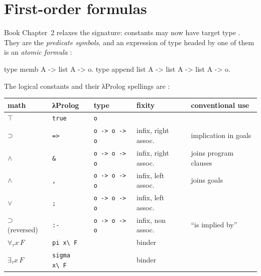 \section{First-order formulas}\label{sec:horn-formulas}

Book Chapter~2 relaxes the signature: constants may now have target type . They are the
\emph{predicate symbols}, and an expression of type  headed by one of them is an \emph{atomic
formula} :
\begin{lprolog}
type memb    A -> list A -> o.
type append  list A -> list A -> list A -> o.
\end{lprolog}
The logical constants and their λProlog spellings are :
\par\medskip
\begin{fullwidth}
\begin{center}
\begin{tabular}{@{}lllll@{}}
\toprule
math & λProlog & type & fixity & conventional use\\
\midrule
$\top$ & \texttt{true} & \texttt{o} & & \\
$\supset$ & \texttt{=>} & \texttt{o -> o -> o} & infix, right assoc. & implication in goals\\
$\wedge$ & \texttt{\&} & \texttt{o -> o -> o} & infix, right assoc. & joins program clauses\\
$\wedge$ & \texttt{,} & \texttt{o -> o -> o} & infix, left assoc. & joins goals\\
$\vee$ & \texttt{;} & \texttt{o -> o -> o} & infix, left assoc. & \\
$\supset$ (reversed) & \texttt{:-} & \texttt{o -> o -> o} & infix, non assoc. & ``is implied by''\\
$\forall_\tau x\,F$ & \texttt{pi x\textbackslash\ F} & & binder & \\
$\exists_\tau x\,F$ & \texttt{sigma x\textbackslash\ F} & & binder & \\
\bottomrule
\end{tabular}
\end{center}
\end{fullwidth}
\medskip
